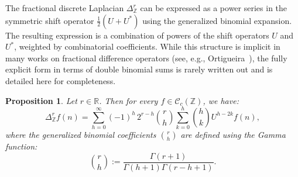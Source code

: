 \documentclass[10pt]{amsart} %
\newcommand{\1}{{\mathbb{I}}}
\numberwithin{equation}{section}
\newtheorem{proposition}[theorem]{Proposition}%
\begin{document}
The fractional discrete Laplacian \( \Delta_{\mathbb{Z}}^r \) can be expressed as a power series in the symmetric shift operator \( \tfrac{1}{2}(U + U^*) \) using the generalized binomial expansion. The resulting expression is a combination of powers of the shift operators \( U \) and \( U^* \), weighted by combinatorial coefficients. While this structure is implicit in many works on fractional difference operators (see, e.g., Ortigueira~\cite{Or}), the fully explicit form in terms of double binomial sums is rarely written out and is detailed here for completeness.

\begin{proposition}\label{f-calculus}
Let \( r \in \mathbb{R} \). Then for every \( f \in \mathcal{C}_c(\mathbb{Z}) \), we have:
\begin{equation}\label{eq:binom-DeltaZ}
\Delta_{\mathbb{Z}}^r f(n)
= \sum_{h=0}^\infty (-1)^h\, 2^{r-h} \binom{r}{h}
\sum_{k=0}^h \binom{h}{k} U^{h - 2k} f(n),
\end{equation}
where the generalized binomial coefficients \( \binom{r}{h} \) are defined using the Gamma function:
\[
\binom{r}{h} := \frac{\Gamma(r+1)}{\Gamma(h+1)\Gamma(r - h + 1)}.
\]
\end{proposition}
\end{document}
